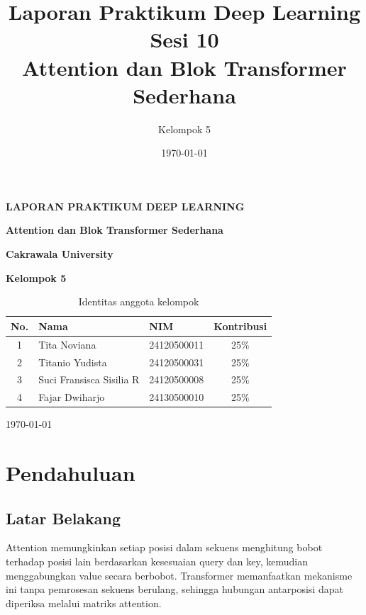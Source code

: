 \documentclass[12pt,a4paper]{article}
\title{\textbf{Laporan Praktikum Deep Learning Sesi 10}\\
Attention dan Blok Transformer Sederhana}
\author{Kelompok 5}
\date{\today}
\begin{document}
\begin{titlepage}
    \centering
    {\large \textbf{LAPORAN PRAKTIKUM DEEP LEARNING}\par}
    \vspace{0.8cm}
    {\Large \textbf{Attention dan Blok Transformer Sederhana}\par}
    \vspace{1.5cm}
    {\large \textbf{Cakrawala University}\par}
    \vspace{1.5cm}

    \vspace{1.5cm}

    {\large \textbf{Kelompok 5}\par}
    \vspace{0.5cm}
    \begin{table}[H]
        \centering
        \caption*{Identitas anggota kelompok}
        \renewcommand{\arraystretch}{1.3}
        \begin{tabular}{c l l c}
            \toprule
            \textbf{No.} & \textbf{Nama} & \textbf{NIM} & \textbf{Kontribusi} \\
            \midrule
            1 & Tita Noviana & 24120500011 & 25\% \\
            2 & Titanio Yudista & 24120500031 & 25\% \\
            3 & Suci Fransisca Sisilia R & 24120500008 & 25\% \\
            4 & Fajar Dwiharjo & 24130500010 & 25\% \\
            \bottomrule
        \end{tabular}
    \end{table}

    \vfill
    {\large \today\par}
\end{titlepage}

\tableofcontents
\newpage

\section{Pendahuluan}

\subsection{Latar Belakang}
Attention memungkinkan setiap posisi dalam sekuens menghitung bobot terhadap
posisi lain berdasarkan kesesuaian query dan key, kemudian menggabungkan value
secara berbobot. Transformer memanfaatkan mekanisme ini tanpa pemrosesan
sekuens berulang, sehingga hubungan antarposisi dapat diperiksa melalui
matriks attention.
\end{document}
